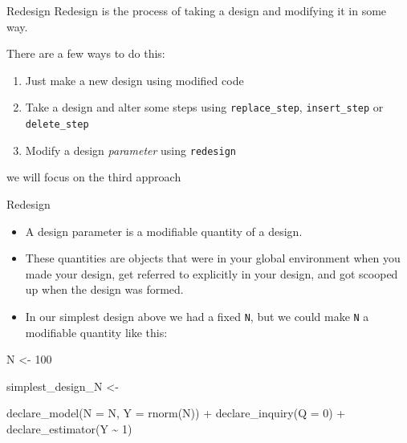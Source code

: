 \documentclass[
  11pt,
  ignorenonframetext,
]{beamer}
\newenvironment{Shaded}{\begin{snugshade}}{\end{snugshade}}
\newcommand{\AttributeTok}[1]{\textcolor[rgb]{0.40,0.45,0.13}{#1}}
\newcommand{\DecValTok}[1]{\textcolor[rgb]{0.68,0.00,0.00}{#1}}
\newcommand{\FunctionTok}[1]{\textcolor[rgb]{0.28,0.35,0.67}{#1}}
\newcommand{\NormalTok}[1]{\textcolor[rgb]{0.00,0.23,0.31}{#1}}
\newcommand{\OtherTok}[1]{\textcolor[rgb]{0.00,0.23,0.31}{#1}}
\newcommand{\SpecialCharTok}[1]{\textcolor[rgb]{0.37,0.37,0.37}{#1}}
\providecommand{\tightlist}{%
  \setlength{\itemsep}{0pt}\setlength{\parskip}{0pt}}\usepackage{longtable,booktabs,array}
\begin{document}
\begin{frame}[fragile]{Redesign}
\protect\hypertarget{redesign-1}{}
Redesign is the process of taking a design and modifying it in some way.

There are a few ways to do this:

\begin{enumerate}
\tightlist
\item
  Just make a new design using modified code
\item
  Take a design and alter some steps using \texttt{replace\_step},
  \texttt{insert\_step} or \texttt{delete\_step}
\item
  Modify a design \emph{parameter} using \texttt{redesign}
\end{enumerate}

we will focus on the third approach
\end{frame}

\begin{frame}[fragile]{Redesign}
\protect\hypertarget{redesign-2}{}
\begin{itemize}
\item
  A design parameter is a modifiable quantity of a design.
\item
  These quantities are objects that were in your global environment when
  you made your design, get referred to explicitly in your design, and
  got scooped up when the design was formed.
\item
  In our simplest design above we had a fixed \texttt{N}, but we could
  make \texttt{N} a modifiable quantity like this:
\end{itemize}

\begin{Shaded}
\begin{Highlighting}[]
\NormalTok{N }\OtherTok{\textless{}{-}} \DecValTok{100}

\NormalTok{simplest\_design\_N }\OtherTok{\textless{}{-}} 
  
  \FunctionTok{declare\_model}\NormalTok{(}\AttributeTok{N =}\NormalTok{ N, }\AttributeTok{Y =} \FunctionTok{rnorm}\NormalTok{(N)) }\SpecialCharTok{+}
  \FunctionTok{declare\_inquiry}\NormalTok{(}\AttributeTok{Q =} \DecValTok{0}\NormalTok{) }\SpecialCharTok{+}
  \FunctionTok{declare\_estimator}\NormalTok{(Y }\SpecialCharTok{\textasciitilde{}} \DecValTok{1}\NormalTok{)}
\end{Highlighting}
\end{Shaded}
\end{frame}
\end{document}
